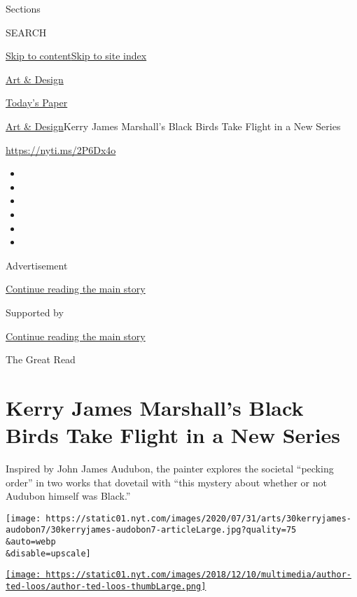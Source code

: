 Sections

SEARCH

\protect\hyperlink{site-content}{Skip to
content}\protect\hyperlink{site-index}{Skip to site index}

\href{https://www.nytimes.com/section/arts/design}{Art \& Design}

\href{https://myaccount.nytimes.com/auth/login?response_type=cookie\&client_id=vi}{}

\href{https://www.nytimes.com/section/todayspaper}{Today's Paper}

\href{/section/arts/design}{Art \& Design}\textbar{}Kerry James
Marshall's Black Birds Take Flight in a New Series

\url{https://nyti.ms/2P6Dx4o}

\begin{itemize}
\item
\item
\item
\item
\item
\item
\end{itemize}

Advertisement

\protect\hyperlink{after-top}{Continue reading the main story}

Supported by

\protect\hyperlink{after-sponsor}{Continue reading the main story}

The Great Read

\hypertarget{kerry-james-marshalls-black-birds-take-flight-in-a-new-series}{%
\section{Kerry James Marshall's Black Birds Take Flight in a New
Series}\label{kerry-james-marshalls-black-birds-take-flight-in-a-new-series}}

Inspired by John James Audubon, the painter explores the societal
``pecking order'' in two works that dovetail with ``this mystery about
whether or not Audubon himself was Black.''

\texttt{[image: https://static01.nyt.com/images/2020/07/31/arts/30kerryjames-audobon7/30kerryjames-audobon7-articleLarge.jpg?quality=75\\\&auto=webp\\\&disable=upscale]}

\href{https://www.nytimes.com/by/ted-loos}{\texttt{[image: https://static01.nyt.com/images/2018/12/10/multimedia/author-ted-loos/author-ted-loos-thumbLarge.png]}}

